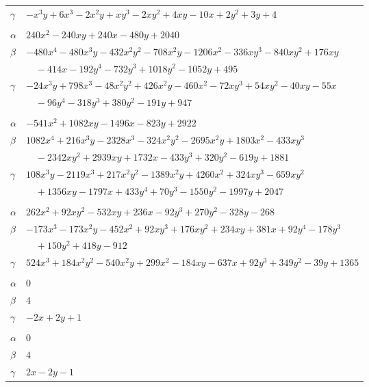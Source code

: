 \documentclass[11pt]{article}
\begin{document}
\begin{longtable}{@{}ll@{}}
$\gamma$ & $-x^{3}y+6x^{3}-2x^{2}y+xy^{3}-2xy^{2}+4xy-10x+2y^{2}+3y+4$\\
\addlinespace[3pt]
\multicolumn{2}{@{}l}{$\{i,j\}=\{76,151\}$, $k_{ij}=3^{3}\cdot 5\cdot 7^{2}$}\\
$\alpha$ & $240x^{2}-240xy+240x-480y+2040$\\
$\beta$ & $-480x^{4}-480x^{3}y-432x^{2}y^{2}-708x^{2}y-1206x^{2}-336xy^{3}-840xy^{2}+176xy$\\
 & $\quad -414x-192y^{4}-732y^{3}+1018y^{2}-1052y+495$\\
$\gamma$ & $-24x^{3}y+798x^{3}-48x^{2}y^{2}+426x^{2}y-460x^{2}-72xy^{3}+54xy^{2}-40xy-55x$\\
 & $\quad -96y^{4}-318y^{3}+380y^{2}-191y+947$\\
\addlinespace[3pt]
\multicolumn{2}{@{}l}{$\{i,j\}=\{76,163\}$, $k_{ij}=3^{2}\cdot 7\cdot 13^{2}$}\\
$\alpha$ & $-541x^{2}+1082xy-1496x-823y+2922$\\
$\beta$ & $1082x^{4}+216x^{3}y-2328x^{3}-324x^{2}y^{2}-2695x^{2}y+1803x^{2}-433xy^{3}$\\
 & $\quad -2342xy^{2}+2939xy+1732x-433y^{3}+320y^{2}-619y+1881$\\
$\gamma$ & $108x^{3}y-2119x^{3}+217x^{2}y^{2}-1389x^{2}y+4260x^{2}+324xy^{3}-659xy^{2}$\\
 & $\quad +1356xy-1797x+433y^{4}+70y^{3}-1550y^{2}-1997y+2047$\\
\addlinespace[3pt]
\multicolumn{2}{@{}l}{$\{i,j\}=\{76,170\}$, $k_{ij}=2\cdot 3\cdot 13^{2}$}\\
$\alpha$ & $262x^{2}+92xy^{2}-532xy+236x-92y^{3}+270y^{2}-328y-268$\\
$\beta$ & $-173x^{3}-173x^{2}y-452x^{2}+92xy^{3}+176xy^{2}+234xy+381x+92y^{4}-178y^{3}$\\
 & $\quad +150y^{2}+418y-912$\\
$\gamma$ & $524x^{3}+184x^{2}y^{2}-540x^{2}y+299x^{2}-184xy-637x+92y^{3}+349y^{2}-39y+1365$\\
\addlinespace[3pt]
\multicolumn{2}{@{}l}{$\{i,j\}=\{76,199\}$, $k_{ij}=7$}\\
$\alpha$ & $0$\\
$\beta$ & $4$\\
$\gamma$ & $-2x+2y+1$\\
\addlinespace[3pt]
\multicolumn{2}{@{}l}{$\{i,j\}=\{76,223\}$, $k_{ij}=7$}\\
$\alpha$ & $0$\\
$\beta$ & $4$\\
$\gamma$ & $2x-2y-1$\\

\end{longtable}
\end{document}
